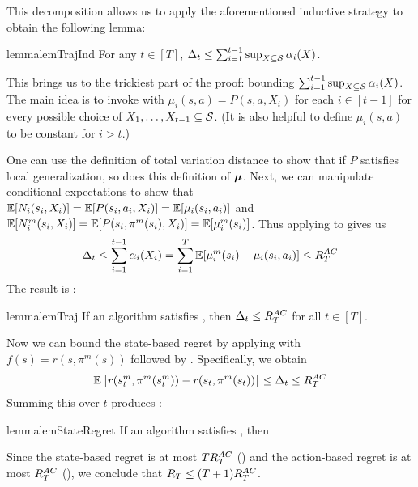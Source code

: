 This decomposition allows us to apply the aforementioned inductive strategy to obtain the following lemma:

\begin{restatable}{lemma}{lemTrajInd}\label{lem:trajectories-induction}
For any $t \in [T]$, $\Delta_t \le \sum_{i=1}^{t-1}\sup_{X\subseteq \mathcal{S}}\alpha_i(X)$.
\end{restatable}

This brings us to the trickiest part of the proof: bounding $\sum_{i=1}^{t-1}\sup_{X\subseteq \mathcal{S}}\alpha_i(X)$. The main idea is to invoke  with $\mu_i(s, a) = P(s,a,X_i)$ for each $i \in [t-1]$ for every possible choice of $X_1,\dots,X_{t-1} \subseteq \mathcal{S}$. (It is also helpful to define $\mu_i(s,a)$ to be constant for $i > t$.) 

One can use the definition of total variation distance to show that if $P$ satisfies local generalization, so does this definition of $\boldsymbol{\mu}$. Next, we can manipulate conditional expectations to show that $\operatorname*{\mathbb{E}}[N_i(s_i,X_i)] = \operatorname*{\mathbb{E}}[P(s_i,a_i,X_i)] = \operatorname*{\mathbb{E}}[\mu_i(s_i,a_i)]$ and $\operatorname*{\mathbb{E}}[N_i^m(s_i, X_i)] = \operatorname*{\mathbb{E}}[P(s_i, \pi^m(s_i), X_i)] = \operatorname*{\mathbb{E}}[\mu_i^m(s_i)]$. Thus applying  to  gives us
\begin{align*}
\Delta_t \le \sum_{i=1}^{t-1}\alpha_i(X_i) 
= \sum_{i=1}^T \operatorname*{\mathbb{E}}[\mu_i^m(s_i) - \mu_i(s_i, a_i)]
\le R_T^{AC}
\end{align*}
The result is :

\begin{restatable}{lemma}{lemTraj}
\label{lem:trajectories}
If an algorithm satisfies , then $\Delta_t \le R_T^{AC}$ for all $t \in [T]$.
\end{restatable}

Now we can bound the state-based regret by applying  with $f(s) = r(s, \pi^m(s))$ followed by . Specifically, we obtain
\[
\operatorname*{\mathbb{E}}\big[r(s_t^m, \pi^m(s_t^m)) - r(s_t, \pi^m(s_t))\big] \le \Delta_t \le R_T^{AC}
\]
Summing this over $t$ produces :

\begin{restatable}{lemma}{lemStateRegret}
\label{lem:state-regret}
If an algorithm satisfies , then 
\end{restatable}

Since the state-based regret is at most $T R_T^{AC}$ () and the action-based regret is at most $R_T^{AC}$ (), we conclude that $R_T \le (T+1)R_T^{AC}$.
